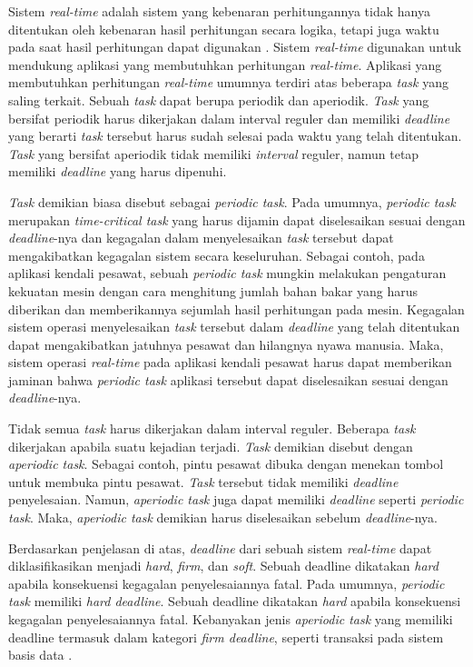 Sistem \textit{real-time} adalah sistem yang kebenaran perhitungannya tidak hanya ditentukan
oleh kebenaran hasil perhitungan secara logika, tetapi juga waktu pada saat hasil perhitungan
dapat digunakan \citep[pp.~6-7]{Shin1994}.  Sistem \textit{real-time} digunakan untuk mendukung
aplikasi yang membutuhkan perhitungan \textit{real-time}.  Aplikasi yang membutuhkan perhitungan
\textit{real-time} umumnya terdiri atas beberapa \textit{task} yang saling terkait.  Sebuah
\textit{task} dapat berupa periodik dan aperiodik. \textit{Task} yang bersifat periodik harus
dikerjakan dalam interval reguler dan memiliki \textit{deadline} yang berarti \textit{task}
tersebut harus sudah selesai pada waktu yang telah ditentukan. \textit{Task} yang bersifat
aperiodik tidak memiliki \textit{interval} reguler, namun tetap memiliki \textit{deadline} yang
harus dipenuhi.

\textit{Task} demikian biasa disebut sebagai \textit{periodic task}.  Pada umumnya,
\textit{periodic task} merupakan \textit{time-critical task} yang harus dijamin dapat
diselesaikan sesuai dengan \textit{deadline}-nya dan kegagalan dalam menyelesaikan \textit{task}
tersebut dapat mengakibatkan kegagalan sistem secara keseluruhan.  Sebagai contoh, pada aplikasi
kendali pesawat, sebuah \textit{periodic task} mungkin melakukan pengaturan kekuatan mesin
dengan cara menghitung jumlah bahan bakar yang harus diberikan dan memberikannya sejumlah hasil
perhitungan pada mesin.  Kegagalan sistem operasi menyelesaikan \textit{task} tersebut dalam
\textit{deadline} yang telah ditentukan dapat mengakibatkan jatuhnya pesawat dan hilangnya nyawa
manusia.  Maka, sistem operasi \textit{real-time} pada aplikasi kendali pesawat harus dapat
memberikan jaminan bahwa \textit{periodic task} aplikasi tersebut dapat diselesaikan sesuai
dengan \textit{deadline}-nya.

Tidak semua \textit{task} harus dikerjakan dalam interval reguler. Beberapa \textit{task}
dikerjakan apabila suatu kejadian terjadi.  \textit{Task} demikian disebut dengan
\textit{aperiodic task}.  Sebagai contoh, pintu pesawat dibuka dengan menekan tombol untuk
membuka pintu pesawat.  \textit{Task} tersebut tidak memiliki \textit{deadline} penyelesaian.
Namun, \textit{aperiodic task} juga dapat memiliki \textit{deadline} seperti \textit{periodic
task}.  Maka, \textit{aperiodic task} demikian harus diselesaikan sebelum \textit{deadline}-nya.

Berdasarkan penjelasan di atas, \textit{deadline} dari sebuah sistem \textit{real-time} dapat
diklasifikasikan menjadi \textit{hard}, \textit{firm}, dan \textit{soft}.  Sebuah deadline
dikatakan \textit{hard} apabila konsekuensi kegagalan penyelesaiannya fatal.  Pada umumnya,
\textit{periodic task} memiliki \textit{hard deadline}.  Sebuah deadline dikatakan \textit{hard}
apabila konsekuensi kegagalan penyelesaiannya fatal.  Kebanyakan jenis \textit{aperiodic task}
yang memiliki deadline termasuk dalam kategori \textit{firm deadline}, seperti transaksi pada
sistem basis data \citep[pp.~203-241]{Haritsa1992}.


